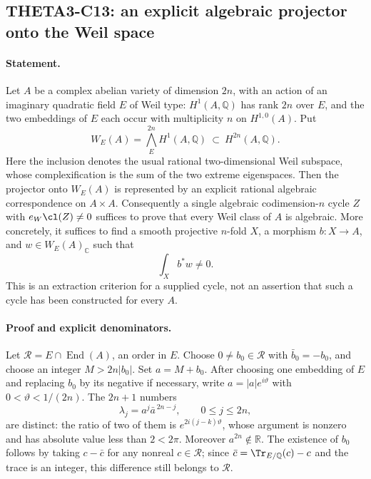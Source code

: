 \documentclass[11pt]{article}
\newcommand{\Q}{\mathbb Q}\newcommand{\C}{\mathbb C}\newcommand{\Z}{\mathbb Z}\newcommand{\R}{\mathbb R}\newcommand{\A}{\mathbb A}\newcommand{\OO}{\mathcal O}
\theoremstyle{definition}\newtheorem{definition}[theorem]{Definition}\newtheorem{remark}[theorem]{Remark}
\begin{document}
\subsection{THETA3-C13: an explicit algebraic projector onto the Weil space}\label{C13}

\paragraph{Statement.}
Let $A$ be a complex abelian variety of dimension $2n$, with an action of
an imaginary quadratic field $E$ of Weil type: $H^1(A,\Q)$ has rank
$2n$ over $E$, and the two embeddings of $E$ each occur with multiplicity
$n$ on $H^{1,0}(A)$. Put
\[
 W_E(A)=\bigwedge_E^{2n}H^1(A,\Q)\ \subset\ H^{2n}(A,\Q).
\]
Here the inclusion denotes the usual rational two-dimensional Weil
subspace, whose complexification is the sum of the two extreme
eigenspaces. Then the projector onto $W_E(A)$ is represented by an
explicit rational algebraic correspondence on $A\times A$.
Consequently a single algebraic codimension-$n$ cycle $Z$ with
$e_W\cl(Z)\ne0$ suffices to prove that every Weil class of $A$ is
algebraic. More concretely, it suffices to find a smooth projective
$n$-fold $X$, a morphism $b:X\to A$, and $w\in W_E(A)_{\C}$ such that
\begin{equation}\label{C13-period}
 \int_X b^*w\ne0.
\end{equation}
This is an extraction criterion for a supplied cycle, not an assertion
that such a cycle has been constructed for every $A$.

\paragraph{Proof and explicit denominators.}
Let $\mathcal R=E\cap\operatorname{End}(A)$, an order in $E$.
Choose $0\ne b_0\in\mathcal R$ with $\bar b_0=-b_0$, and choose an
integer $M>2n|b_0|$. Set $a=M+b_0$. After choosing one embedding of
$E$ and replacing $b_0$ by its negative if necessary, write
$a=|a|e^{i\vartheta}$ with $0<\vartheta<1/(2n)$.
The $2n+1$ numbers
\[
 \lambda_j=a^j\bar a^{\,2n-j},\qquad 0\le j\le2n,
\]
are distinct: the ratio of two of them is
$e^{2i(j-k)\vartheta}$, whose argument is nonzero and has absolute
value less than $2<2\pi$. Moreover $a^{2n}\notin\R$.
The existence of $b_0$ follows by taking $c-\bar c$ for any nonreal
$c\in\mathcal R$; since $\bar c=\Tr_{E/\Q}(c)-c$ and the trace is an
integer, this difference still belongs to $\mathcal R$.
\end{document}
